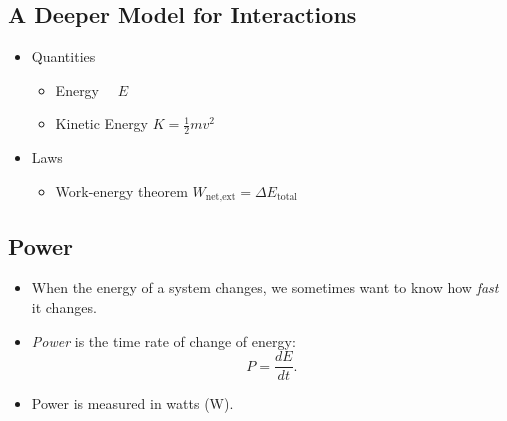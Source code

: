 \documentclass[]{article}
\begin{document}
\begin{PresentSpace}
\vspace{-10pt}
\section*{A Deeper Model for Interactions}
\vspace{-10pt}
\begin{itemize}
	\item Quantities
	\begin{itemize}
		\item Energy \qquad \qquad \qquad \quad \ \ $E$
		\item Kinetic Energy \qquad \qquad $K=\frac{1}{2}mv^{2}$
	\end{itemize}
	\item Laws
	\begin{itemize}
		\item Work-energy theorem \quad $W_{\text{net,ext}} = \Delta E_{\text{total}}$
	\end{itemize}
\end{itemize}
\end{PresentSpace}
\newpage
\begin{TeacherMargin}

\end{TeacherMargin}
\begin{PresentSpace}
\vspace{-10pt}
\section*{Power}
\vspace{-10pt}
\begin{itemize}
	\item When the energy of a system changes, we sometimes want to know how \textit{fast} it changes.
	\item \textit{Power} is the time rate of change of energy:
	\[
	P=\frac{dE}{dt}.
	\]
	\item Power is measured in watts (W).
\end{itemize}
\end{PresentSpace}
\newpage
\end{document}
